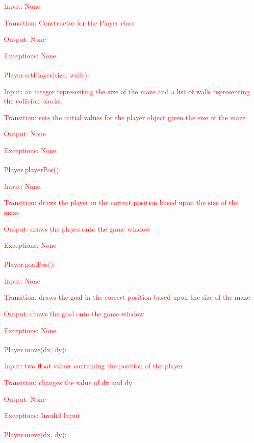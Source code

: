 \documentclass[12pt, titlepage]{article}
\begin{document}
		\textcolor{red}{Input: None}
		
		\textcolor{red}{Transition: Constructor for the Player class}
		
		\textcolor{red}{Output: None}
		
		\textcolor{red}{Exceptions: None}\\
        \\
        \textcolor{red}{Player.setPlayer(size, walls)}:
		
		\textcolor{red}{Input: an integer representing the size of the maze and a list of walls representing the collision blocks}
		
		\textcolor{red}{Transition: sets the initial values for the player object given the size of the maze}
		
		\textcolor{red}{Output: None}
		
		\textcolor{red}{Exceptions: None}\\
        \\
        \textcolor{red}{Player.playerPos()}:
		
		\textcolor{red}{Input: None}
		
		\textcolor{red}{Transition: draws the player in the correct position based upon the size of the maze}
		
		\textcolor{red}{Output: draws the player onto the game window}
		
		\textcolor{red}{Exceptions: None}\\
        \\
        \textcolor{red}{Player.goalPos()}:
		
		\textcolor{red}{Input: None}
		
		\textcolor{red}{Transition: draws the goal in the correct position based upon the size of the maze}
		
		\textcolor{red}{Output: draws the goal onto the game window}
		
		\textcolor{red}{Exceptions: None}\\
        \\
        \textcolor{red}{Player.move(dx, dy)}:
		
		\textcolor{red}{Input: two float values containing the position of the player}
		
		\textcolor{red}{Transition: changes the value of dx and dy}
		
		\textcolor{red}{Output: None}
		
		\textcolor{red}{Exceptions: Invalid Input}\\
        \\
        \textcolor{red}{Player.move(dx, dy)}:
		
\end{document}
